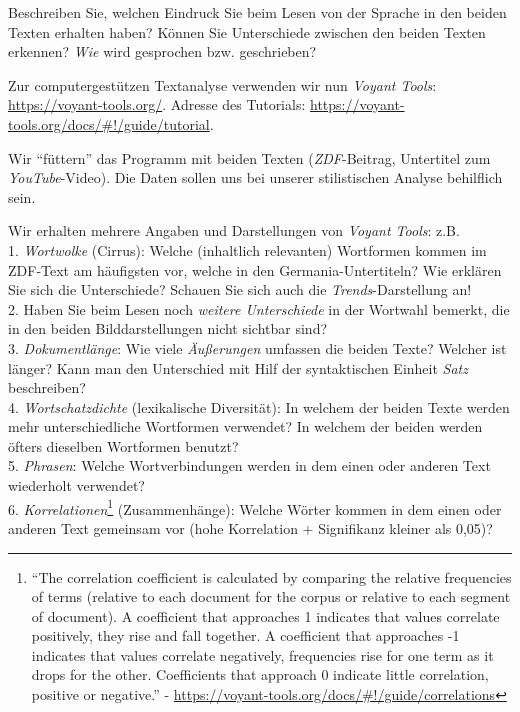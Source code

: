 \documentclass[
  letterpaper,
]{scrbook}
\begin{document}
Beschreiben Sie, welchen Eindruck Sie beim Lesen von der Sprache in den
beiden Texten erhalten haben? Können Sie Unterschiede zwischen den
beiden Texten erkennen? \emph{Wie} wird gesprochen bzw. geschrieben?

Zur computergestützen Textanalyse verwenden wir nun \emph{Voyant Tools}:
\url{https://voyant-tools.org/}. Adresse des Tutorials:
\url{https://voyant-tools.org/docs/\#!/guide/tutorial}.

Wir ``füttern'' das Programm mit beiden Texten (\emph{ZDF}-Beitrag,
Untertitel zum \emph{YouTube}-Video). Die Daten sollen uns bei unserer
stilistischen Analyse behilflich sein.

Wir erhalten mehrere Angaben und Darstellungen von \emph{Voyant Tools}:
z.B.\\
1. \emph{Wortwolke} (Cirrus): Welche (inhaltlich relevanten) Wortformen
kommen im ZDF-Text am häufigsten vor, welche in den
Germania-Untertiteln? Wie erklären Sie sich die Unterschiede? Schauen
Sie sich auch die \emph{Trends}-Darstellung an!\\
2. Haben Sie beim Lesen noch \emph{weitere Unterschiede} in der Wortwahl
bemerkt, die in den beiden Bilddarstellungen nicht sichtbar sind?\\
3. \emph{Dokumentlänge}: Wie viele \emph{Äußerungen} umfassen die beiden
Texte? Welcher ist länger? Kann man den Unterschied mit Hilf der
syntaktischen Einheit \emph{Satz} beschreiben?\\
4. \emph{Wortschatzdichte} (lexikalische Diversität): In welchem der
beiden Texte werden mehr unterschiedliche Wortformen verwendet? In
welchem der beiden werden öfters dieselben Wortformen benutzt?\\
5. \emph{Phrasen}: Welche Wortverbindungen werden in dem einen oder
anderen Text wiederholt verwendet?\\
6. \emph{Korrelationen}\footnote{``The correlation coefficient is
  calculated by comparing the relative frequencies of terms (relative to
  each document for the corpus or relative to each segment of document).
  A coefficient that approaches 1 indicates that values correlate
  positively, they rise and fall together. A coefficient that approaches
  -1 indicates that values correlate negatively, frequencies rise for
  one term as it drops for the other. Coefficients that approach 0
  indicate little correlation, positive or negative.'' -
  \url{https://voyant-tools.org/docs/\#!/guide/correlations}}
(Zusammenhänge): Welche Wörter kommen in dem einen oder anderen Text
gemeinsam vor (hohe Korrelation + Signifikanz kleiner als 0,05)?
\end{document}
